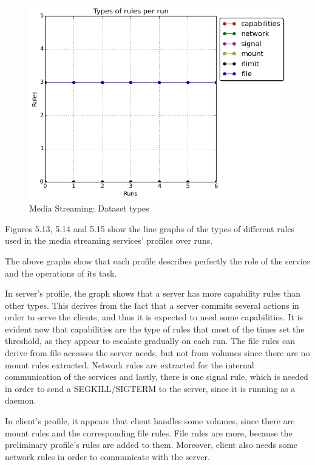 \hfill\break\hfill\break\hfill\break\hfill\break\hfill\break\hfill\break\hfill\break\hfill\break\hfill\break\hfill\break\hfill\break\hfill\break\hfill\break\hfill\break\hfill\break\hfill\break\hfill\break\hfill\break

\begin{figure}[h!]
  \centering
   \includegraphics[width=0.7\linewidth]{../figures/mediastreaming/types_cloudsuitemedia-streamingdataset.png}
   \caption{Media Streaming: Dataset types}
\end{figure}

Figures 5.13, 5.14 and 5.15 show the line graphs of the types of different rules used in the media streaming services' profiles over runs. 

The above graphs show that each profile describes perfectly the role of the service and the operations of its task.

In server's profile, the graph shows that a server has more capability rules than other types. This derives from the fact that a server commits several actions in order to serve the clients, and thus it is expected to need some capabilities. It is evident now that capabilities are the type of rules that most of the times set the threshold, as they appear to escalate gradually on each run. The file rules can derive from file accesses the server needs, but not from volumes since there are no mount rules extracted. Network rules are extracted for the internal communication of the services and lastly, there is one signal rule, which is needed in order to send a SEGKILL/SIGTERM to the server, since it is running as a daemon.

In client's profile, it appears that client handles some volumes, since there are mount rules and the corresponding file rules. File rules are more, because the preliminary profile's rules are added to them. Moreover, client also needs some network rules in order to communicate with the server.

